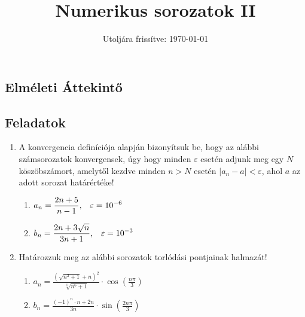 \documentclass[a4paper, 12pt]{scrartcl}
\title{Numerikus sorozatok II}
\date{Utoljára frissítve: \today}
\begin{document}
\maketitle

\subsection{Elméleti Áttekintő}

\clearpage
\subsection{Feladatok}

\begin{enumerate}
  \item A konvergencia definíciója alapján bizonyítsuk be, hogy az alábbi
        számsorozatok konvergensek, úgy hogy minden $\varepsilon$ esetén adjunk
        meg egy $N$ köszöbszámort, amelytől kezdve minden $n > N$ esetén
        $|a_n - a| < \varepsilon$, ahol $a$ az adott sorozat határértéke!
        \begin{enumerate}
          \item $\displaystyle
                  a_n = \frac{2n + 5}{n - 1}
                  \text,\quad
                  \varepsilon = 10^{-6}
                $

          \item $\displaystyle
                  b_n = \frac{2n + 3 \sqrt{n}}{3n + 1}
                  \text,\quad
                  \varepsilon = 10^{-3}
                $
        \end{enumerate}

  \item Határozzuk meg az alábbi sorozatok torlódási pontjainak halmazát!
        \begin{enumerate}
          \item $\displaystyle
                  a_n = \frac{\left(
                    \sqrt{n^2 + 1} + n
                    \right)^2}{
                    \sqrt[3]{n^6 + 1}
                  } \cdot \cos\left(
                  \frac{n\pi}{3}
                  \right)
                $

          \item $\displaystyle
                  b_n = \frac{(-1)^n \cdot n + 2n}{3n} \cdot \sin\left(
                  \frac{2n\pi}{3}
                  \right)
                $
        \end{enumerate}


\end{enumerate}
\end{document}
